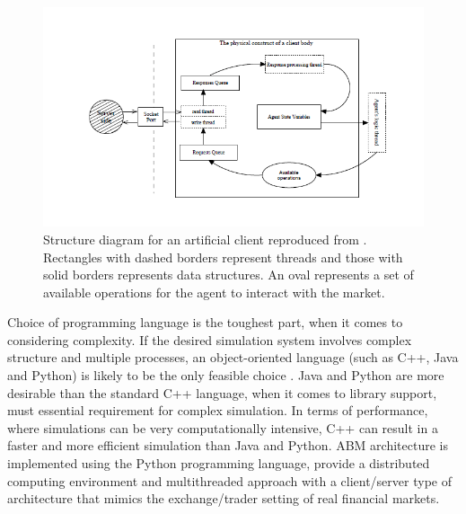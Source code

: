 \documentclass[12pt,a4paper]{article}
\numberwithin{equation}{section}
\numberwithin{figure}{section}
\numberwithin{table}{section}
\begin{document}
\begin{figure}[ht]
\begin{center}
\includegraphics[width=\textwidth]{CLIENT}
\caption{Structure diagram for an artificial client reproduced from \citet{guo2005}. Rectangles with dashed
borders represent threads and those with solid borders represents data structures. An oval represents a set of available operations for the agent to interact with the market.}
\label{fig:client}
\end{center}
\end{figure}

Choice of programming language is the toughest part, when it comes to considering complexity. If the desired simulation system involves complex structure and multiple processes, an object-oriented language (such as C++,
Java and Python) is likely to be the only feasible choice \citep{guo2005}. Java and Python are more desirable than the standard C++ language, when it comes to library support, must essential requirement for complex simulation. In terms of performance, where simulations can be very computationally intensive, C++ can result in a faster and more efficient simulation than Java and Python. \citet{guo2005} ABM architecture is implemented using the Python programming language, provide a distributed computing environment and multithreaded approach with a client/server type of architecture that mimics the exchange/trader setting of real financial markets.
\end{document}
